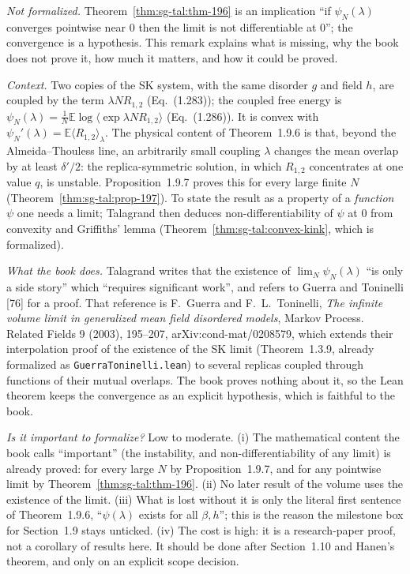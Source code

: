 \begin{remark}
\label{rem:sg-tal:coupled-limit-existence}
\emph{Not formalized.} Theorem~\ref{thm:sg-tal:thm-196} is an implication ``if $\psi_N(\lambda)$ converges pointwise near $0$ then the limit is not differentiable at $0$''; the convergence is a hypothesis. This remark explains what is missing, why the book does not prove it, how much it matters, and how it could be proved.

\emph{Context.} Two copies of the SK system, with the same disorder $g$ and field $h$, are coupled by the term $\lambda N R_{1,2}$ (Eq.~(1.283)); the coupled free energy is $\psi_N(\lambda)=\frac1N\mathbb E\log\langle\exp\lambda NR_{1,2}\rangle$ (Eq.~(1.286)). It is convex with $\psi_N'(\lambda)=\mathbb E\langle R_{1,2}\rangle_\lambda$. The physical content of Theorem~1.9.6 is that, beyond the Almeida--Thouless line, an arbitrarily small coupling $\lambda$ changes the mean overlap by at least $\delta'/2$: the replica-symmetric solution, in which $R_{1,2}$ concentrates at one value $q$, is unstable. Proposition~1.9.7 proves this for every large finite $N$ (Theorem~\ref{thm:sg-tal:prop-197}). To state the result as a property of a \emph{function} $\psi$ one needs a limit; Talagrand then deduces non-differentiability of $\psi$ at $0$ from convexity and Griffiths' lemma (Theorem~\ref{thm:sg-tal:convex-kink}, which is formalized).

\emph{What the book does.} Talagrand writes that the existence of $\lim_N\psi_N(\lambda)$ ``is only a side story'' which ``requires significant work'', and refers to Guerra and Toninelli [76] for a proof. That reference is F.~Guerra and F.~L.~Toninelli, \emph{The infinite volume limit in generalized mean field disordered models}, Markov Process. Related Fields 9 (2003), 195--207, arXiv:cond-mat/0208579, which extends their interpolation proof of the existence of the SK limit (Theorem~1.3.9, already formalized as \texttt{GuerraToninelli.lean}) to several replicas coupled through functions of their mutual overlaps. The book proves nothing about it, so the Lean theorem keeps the convergence as an explicit hypothesis, which is faithful to the book.

\emph{Is it important to formalize?} Low to moderate. (i) The mathematical content the book calls ``important'' (the instability, and non-differentiability of any limit) is already proved: for every large $N$ by Proposition~1.9.7, and for any pointwise limit by Theorem~\ref{thm:sg-tal:thm-196}. (ii) No later result of the volume uses the existence of the limit. (iii) What is lost without it is only the literal first sentence of Theorem~1.9.6, ``$\psi(\lambda)$ exists for all $\beta,h$''; this is the reason the milestone box for Section~1.9 stays unticked. (iv) The cost is high: it is a research-paper proof, not a corollary of results here. It should be done after Section~1.10 and Hanen's theorem, and only on an explicit scope decision.


\end{remark}
